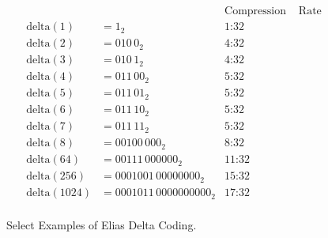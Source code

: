 \begin{figure}
	
	\centering
	\begin{align*}
						&		&\text{Compression}&\text{ Rate}\\
		\mathrm{delta}(1) &= 1_2  &\text{1:32} \\
		\mathrm{delta}(2) &= 010\,0_2 &\text{4:32} \\
		\mathrm{delta}(3) &= 010\,1_2 &\text{4:32} \\
		\mathrm{delta}(4) &= 011\,00_2 &\text{5:32} \\
		\mathrm{delta}(5) &= 011\,01_2 &\text{5:32} \\
		\mathrm{delta}(6) &= 011\,10_2 &\text{5:32} \\
		\mathrm{delta}(7) &= 011\,11_2 &\text{5:32} \\
		\mathrm{delta}(8) &= 00100\,000_2 &\text{8:32}\\
		\mathrm{delta}(64) &= 00111\,000000_2 &\text{11:32}\\
		\mathrm{delta}(256) &= 0001001\,00000000_2 &\text{15:32} \\
		\mathrm{delta}(1024) &= 0001011\,0000000000_2 &\text{17:32} \\
	\end{align*}
	
	\caption{Select Examples of Elias Delta Coding.}
	\label{fig:bg-comp-delta-ex}
\end{figure}